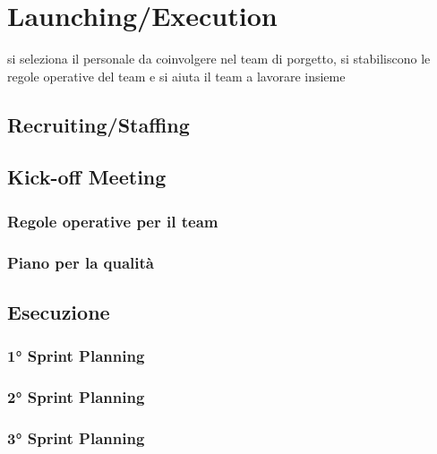 \chapter{Launching/Execution}
si seleziona il personale da coinvolgere nel team di porgetto, si stabiliscono le regole operative del team e si aiuta il team a lavorare insieme

\section{Recruiting/Staffing}

\section{Kick-off Meeting}

\subsection{Regole operative per il team}

\subsection{Piano per la qualità}

\section{Esecuzione}

\subsection{1° Sprint Planning}

\subsection{2° Sprint Planning}

\subsection{3° Sprint Planning}
